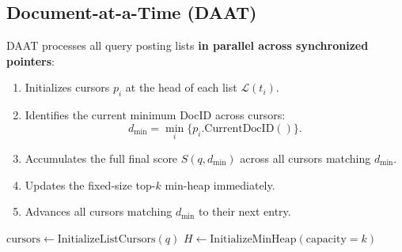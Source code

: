 \subsection{Document-at-a-Time (DAAT)}
DAAT processes all query posting lists \textbf{in parallel across synchronized pointers}:
\begin{enumerate}
    \item Initializes cursors $p_i$ at the head of each list $\mathcal{L}(t_i)$.
    \item Identifies the current minimum DocID across cursors:
    \begin{equation}
    d_{\min} = \min_{i} \{p_i.\text{CurrentDocID}()\}.
    \end{equation}
    \item Accumulates the full final score $S(q, d_{\min})$ across all cursors matching $d_{\min}$.
    \item Updates the fixed-size top-$k$ min-heap immediately.
    \item Advances all cursors matching $d_{\min}$ to their next entry.
\end{enumerate}

\begin{algorithm}[H]
\caption{Document-at-a-Time (DAAT)}
\label{alg:daat-en}

$\text{cursors} \gets \text{InitializeListCursors}(q)$\;
$H \gets \text{InitializeMinHeap}(\text{capacity}=k)$\;

\;
\end{algorithm}

